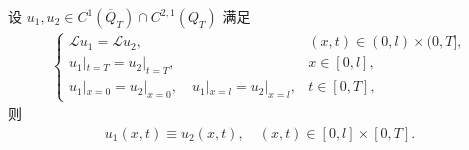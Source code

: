 \documentclass[../../main.tex]{subfiles}%
\begin{document}
\begin{theorem}[反向惟一性]
设 $u_1,u_2\in C^1(\overline{Q}_T)\cap C^{2,1}(Q_T)$ 满足
\begin{align}
\begin{cases}
\mathcal{L}u_1=\mathcal{L}u_2, & (x,t)\in(0,l)\times(0,T],\\
u_1|_{t=T}=u_2|_{t=T}, & x\in[0,l],\\
u_1|_{x=0}=u_2|_{x=0},\quad u_1|_{x=l}=u_2|_{x=l}, & t\in[0,T],
\end{cases} \label{eq:backward-unique}
\end{align}
则
\begin{align*}
u_1(x,t)\equiv u_2(x,t),\quad (x,t)\in[0,l]\times[0,T].
\end{align*}
\end{theorem}
\end{document}

